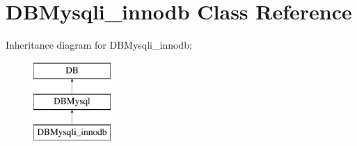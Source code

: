 \hypertarget{classDBMysqli__innodb}{\section{D\-B\-Mysqli\-\_\-innodb Class Reference}
\label{classDBMysqli__innodb}
}
Inheritance diagram for D\-B\-Mysqli\-\_\-innodb\-:\begin{figure}[H]
\begin{center}
\leavevmode
\includegraphics[height=3.000000cm]{classDBMysqli__innodb}
\end{center}
\end{figure}
